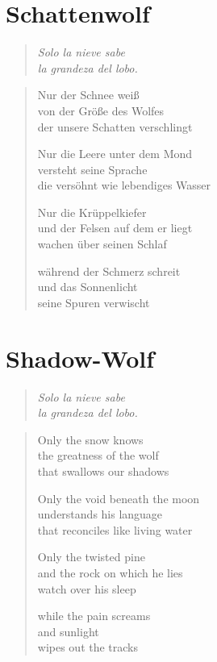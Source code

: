 
\cleartoverso

\section{Schattenwolf}

\begin{quote}
\itshape\smaller
Solo la nieve sabe\\
la grandeza del lobo.

\end{quote}

\begin{verse}
Nur der Schnee weiß\\
von der Größe des Wolfes\\
der unsere Schatten verschlingt

Nur die Leere unter dem Mond\\
versteht seine Sprache\\
die versöhnt wie lebendiges Wasser

Nur die Krüppelkiefer\\
und der Felsen auf dem er liegt\\
wachen über seinen Schlaf

während der Schmerz schreit\\
und das Sonnenlicht\\
seine Spuren verwischt
\end{verse}

\cleartorecto

\section{Shadow-Wolf}

\begin{quote}
\itshape\smaller
Solo la nieve sabe\\
la grandeza del lobo.

\end{quote}

\begin{verse}
Only the snow knows\\
the greatness of the wolf\\
that swallows our shadows

Only the void beneath the moon\\
understands his language\\
that reconciles like living water

Only the twisted pine\\
and the rock on which he lies\\
watch over his sleep

while the pain screams\\
and sunlight\\
wipes out the tracks
\end{verse}
